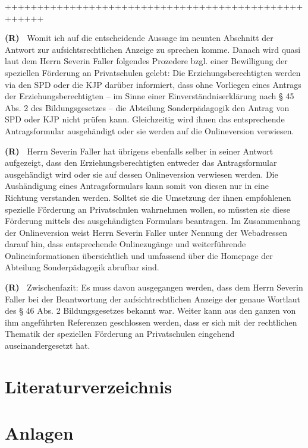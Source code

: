 \documentclass[paper=a4,fontsize=12pt, oneside, numbers=noenddot]{scrbook}
\newcounter{rz}
\newcommand{\Rz}{
	\addtocounter{rz}{1}\textbf{(R\arabic{rz})~}
}
\begin{document}
++++++++++++++++++++++++++++++++++++++++++++++++++++

\Rz Womit ich auf die entscheidende Aussage im neunten Abschnitt der Antwort zur aufsichtsrechtlichen Anzeige zu sprechen komme. Danach wird quasi laut dem Herrn Severin Faller folgendes Prozedere bzgl. einer Bewilligung der speziellen Förderung an Privatschulen gelebt: Die Erziehungsberechtigten werden via den SPD oder die KJP darüber informiert, dass ohne Vorliegen eines Antrags der Erziehungsberechtigten -- im Sinne einer Einverständniserklärung nach § 45 Abs. 2 des Bildungsgesetzes -- die Abteilung Sonderpädagogik den Antrag von SPD oder KJP nicht prüfen kann. Gleichzeitig wird ihnen das entsprechende Antragsformular ausgehändigt oder sie werden auf die Onlineversion verwiesen. 


\Rz Herrn Severin Faller hat übrigens ebenfalls selber in seiner Antwort aufgezeigt, dass den Erziehungsberechtigten entweder das Antragsformular ausgehändigt wird oder sie auf dessen Onlineversion verwiesen werden. Die Aushändigung eines Antragsformulars kann somit von diesen nur in eine Richtung verstanden werden. Solltet sie die Umsetzung der ihnen empfohlenen spezielle Förderung an Privatschulen wahrnehmen wollen, so müssten sie diese Förderung mittels des ausgehändigten Formulars beantragen. Im Zusammenhang der Onlineversion weist Herrn Severin Faller unter Nennung der Webadressen darauf hin, dass entsprechende Onlinezugänge und weiterführende Onlineinformationen übersichtlich und umfassend über die Homepage der Abteilung Sonderpädagogik abrufbar sind.


\Rz Zwischenfazit: Es muss davon ausgegangen werden, dass dem Herrn Severin Faller bei der Beantwortung der aufsichtrechtlichen Anzeige der genaue Wortlaut des § 46 Abs. 2 Bildungsgesetzes bekannt war. Weiter kann aus den ganzen von ihm angeführten Referenzen geschlossen werden, dass er sich mit der rechtlichen Thematik der speziellen Förderung an Privatschulen eingehend auseinandergesetzt hat. 


\chapter{Literaturverzeichnis}
\printbibliography[heading=none]

\chapter{Anlagen}\clearpage
\chead{}\cfoot*{-\pagemark-}
\end{document}
